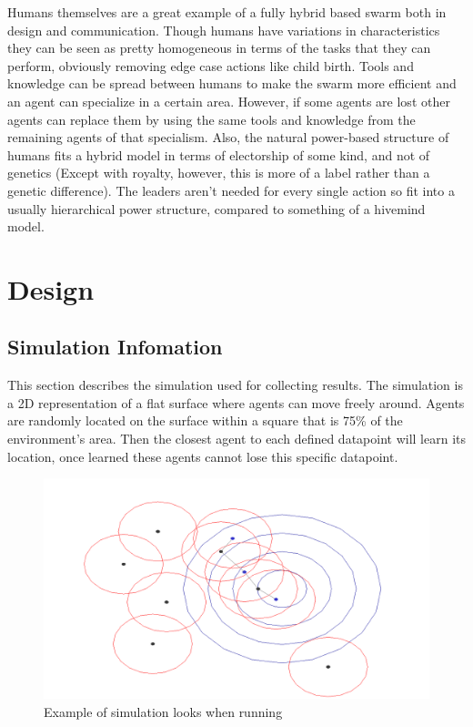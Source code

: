 \documentclass{UoYCSproject}
\begin{document}
Humans themselves are a great example of a fully hybrid based swarm both in design and communication. 
Though humans have variations in characteristics they can be seen as pretty homogeneous in terms of the tasks that they can perform, obviously removing edge case actions like child birth. 
Tools and knowledge can be spread between humans to make the swarm more efficient and an agent can specialize in a certain area. 
However, if some agents are lost other agents can replace them by using the same tools and knowledge from the remaining agents of that specialism. 
Also, the natural power-based structure of humans fits a hybrid model in terms of electorship of some kind, and not of genetics (Except with royalty, however, this is more of a label rather than a genetic difference). 
The leaders aren't needed for every single action so fit into a usually hierarchical power structure, compared to something of a hivemind model.


\chapter{Design}
\label{cha:Design}


\section{Simulation Infomation}
\label{sec:Sim Info}

This section describes the simulation used for collecting results.
The simulation is a 2D representation of a flat surface where agents can move freely around.
Agents are randomly located on the surface within a square that is 75\% of the environment's area.
Then the closest agent to each defined datapoint will learn its location, once learned these agents cannot lose this specific datapoint.

\begin{figure}[htb]
\label{fig:Connarea}
\begin{center}
\centering
\includegraphics[width=\linewidth]{"./ExplanationImgs/Connarea.png"}
\caption{Example of simulation looks when running}
\end{center}
\end{figure}
\end{document}
